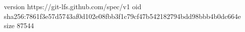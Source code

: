 version https://git-lfs.github.com/spec/v1
oid sha256:7861f3e57d5743af0d102e08fbb3f1c79cf47b542182794bdd98bbb4b0dc664e
size 87544
